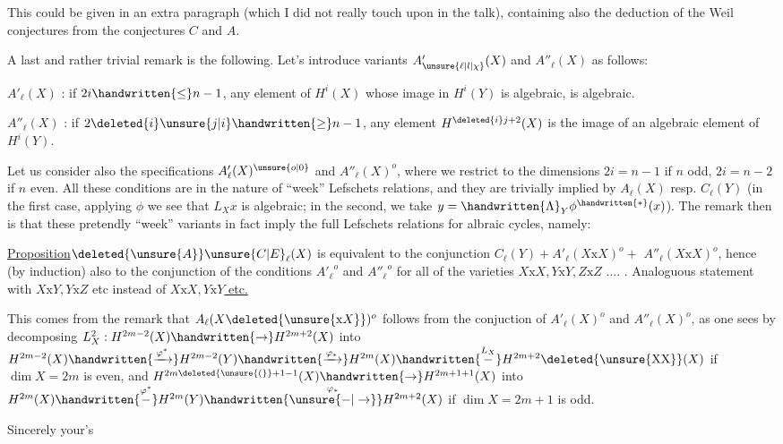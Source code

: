 This could be given in an extra paragraph (which I did not really touch
upon in the talk), containing also the deduction of the Weil conjectures
from the conjectures $C$ and $A$.

A last and rather trivial remark is the following. Let's introduce
 variants $A'_{\unsure{\ell|l|\chi}}(X)$ and $A''_{\ell}(X)$ as follows:

$A'_{\ell}(X)$ : if $2i\handwritten{\leq} n-1$, any element  of $H^{i}(X)$ whose image in $H^{i}(Y)$ is alge\handwritten{\unsure{(|\,}}braic, is algebraic.

$A''_{\ell}(X)$ : if $2\deleted{i}\unsure{j|i}\handwritten{\geq} n-1$, any  element 
$H^{\deleted{i}j+2}(X)$ is  the image of an algebraic element of $H^{i}(Y)$.

Let us consider also the specifications $A'_{\ell}(X)^{\unsure{o|0}}$ and $A''_{\ell}(X)^{o}$, where we
restrict to the  dimensions $2i=n-1$ if $n$ odd, $2i=n-2$ if $n$
even. All these conditions are in the nature of ``week'' Lefschets relations,
and they are trivially implied by $A_{\ell}(X)$ resp. $C_{\ell}(Y)$ (in the first
case, applying $\phi$ we see that $L_{X}x$ is algebraic; in the second, we take
$y=\handwritten{\Lambda}_{Y}\phi^{\handwritten{*}}(x)$). The remark then is that these pretendly ``week'' variants
in fact imply the full Lefschets relations for albraic cycles, namely:

\uline{Proposition}\quad $\deleted{\unsure{A}}\unsure{C|E}_{\ell}(X)$ is equivalent to the conjunction $C_{\ell}(Y)+A'_{\ell}(X\mathbin{\mathrm{x}}X)^{o}+{}$
$A''_{\ell}(X\mathbin{\mathrm{x}}X)^{o}$, hence (by induction) also to the conjunction of the
conditions $ {A'_{\ell}}^{o}$ and $ {A''_{\ell}}^{o}$ for all of the varieties $X\mathbin{\mathrm{x}}X,Y\mathbin{\mathrm{x}}Y,Z\mathbin{\mathrm{x}}Z$ .... . Analoguous statement with $X\mathbin{\mathrm{x}}Y,Y\mathbin{\mathrm{x}}Z$ etc instead of \uline{$X\mathbin{\mathrm{x}}X,Y\mathbin{\mathrm{x}}Y$ etc.}

This comes from the remark that  $A_{\ell}(X\deleted{\unsure{\mathbin{\mathrm{x}}X}})^{o}$ follows from the conjuction of
$A'_{\ell}(X)^{o}$ and $A''_{\ell}(X)^{o}$, as one sees by decomposing $L_{X}^{2}:H^{2m-2}(X)\handwritten{\to}H^{2m+2}(X)$
into $H^{2m-2}(X)\handwritten{\xrightarrow{\varphi^{*}}}H^{2m-2}(Y)\handwritten{\xrightarrow{\varphi_{*}}}H^{2m}(X)\handwritten{\overset{L_{X}}{-}}H^{2m+2}\deleted{\unsure{\mathrm{XX}}}(X)$ if $\dim X=2m$ is even,
and $H^{2m\deleted{\unsure{(}}+1-1}(X)\handwritten{\to}H^{2m+1+1}(X)$ into $H^{2m}(X)\handwritten{\overset{\varphi^{*}}{-}}H^{2m}(Y)\handwritten{\overset{\varphi_{*}}{\unsure{-|\to}}}H^{2m+2}(X)$ if
$\dim X=2m+1$ is odd.

Sincerely your's\\

